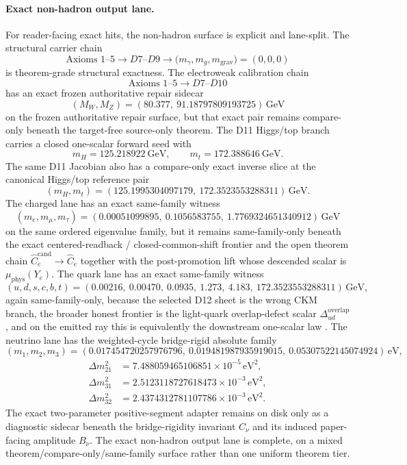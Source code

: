 \documentclass[11pt]{article}
\newcommand{\ophid}[1]{\path{#1}}
\begin{document}
\paragraph{Exact non-hadron output lane.}
For reader-facing exact hits, the non-hadron surface is explicit and lane-split. The structural carrier chain
\[
\text{Axioms }1\text{--}5 \longrightarrow D7\text{--}D9 \longrightarrow
\bigl(m_\gamma,m_g,m_{\mathrm{grav}}\bigr)=(0,0,0)
\]
is theorem-grade structural exactness. The electroweak calibration chain
\[
\text{Axioms }1\text{--}5 \longrightarrow D7\text{--}D10
\]
has an exact frozen authoritative repair sidecar
\[
(M_W,M_Z)=
(80.377,\ 91.18797809193725)\,\mathrm{GeV}
\]
on the frozen authoritative repair surface, but that exact pair remains compare-only beneath the target-free source-only theorem. The D11 Higgs/top branch carries a closed one-scalar forward seed with
\[
m_H=125.218922~\mathrm{GeV},
\qquad
m_t=172.388646~\mathrm{GeV}.
\]
The same D11 Jacobian also has a compare-only exact inverse slice at the canonical Higgs/top reference pair
\[
(m_H,m_t)=
(125.1995304097179,\ 172.3523553288311)\,\mathrm{GeV}.
\]
The charged lane has an exact same-family witness
\[
(m_e,m_\mu,m_\tau)=
(0.00051099895,\ 0.1056583755,\ 1.7769324651340912)\,\mathrm{GeV}
\]
on the same ordered eigenvalue family, but it remains same-family-only beneath the exact centered-readback / closed-common-shift frontier and the open theorem chain \(\widehat C_e^{\mathrm{cand}}\to \widehat C_e\) together with the post-promotion lift whose descended scalar is \(\mu_{\mathrm{phys}}(Y_e)\). The quark lane has an exact same-family witness
\[
(u,d,s,c,b,t)=
(0.00216,\ 0.00470,\ 0.0935,\ 1.273,\ 4.183,\ 172.3523553288311)\,\mathrm{GeV},
\]
again same-family-only, because the selected D12 sheet is the wrong CKM branch, the broader honest frontier is the light-quark overlap-defect scalar \(\Delta_{ud}^{\mathrm{overlap}}\), and on the emitted ray this is equivalently the downstream one-scalar law \ophid{quark_d12_t1_value_law}. The neutrino lane has the weighted-cycle bridge-rigid absolute family
\[
(m_1,m_2,m_3)=
(0.017454720257976796,\ 0.019481987935919015,\ 0.05307522145074924)\,\mathrm{eV},
\]
\[
\begin{aligned}
\Delta m_{21}^2&=7.488059465106851\times10^{-5}\,\mathrm{eV}^2,\\
\Delta m_{31}^2&=2.5123118727618473\times10^{-3}\,\mathrm{eV}^2,\\
\Delta m_{32}^2&=2.4374312781107786\times10^{-3}\,\mathrm{eV}^2.
\end{aligned}
\]
The exact two-parameter positive-segment adapter remains on disk only as a diagnostic sidecar beneath the bridge-rigidity invariant \(C_\nu\) and its induced paper-facing amplitude \(B_\nu\). The exact non-hadron output lane is complete, on a mixed theorem/compare-only/same-family surface rather than one uniform theorem tier.
\end{document}
